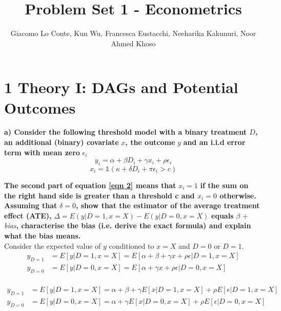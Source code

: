 \documentclass[a4paper,12pt,oneside,English]{article}
\title{Problem Set 1 - Econometrics}
\author{ Giacomo Lo Conte, Kun Wu, Francesca Eustacchi, Neeharika Kakunuri, Noor Ahmed Khoso }
\begin{document}
\maketitle
\section{ 1 Theory I: DAGs and Potential Outcomes}
\textbf{a) Consider the following threshold model with a binary treatment $D$, an additional (binary) covariate} $x$\textbf{, the outcome} $y$ \textbf{and an i.i.d error term with mean zero} $\epsilon_i$
\begin{equation}
    y_i = \alpha + \beta D_i + \gamma x_i + \rho \epsilon_i
\end{equation}
\begin{equation}
\label{eqn 2}
 x_i = \mathds{1}(\kappa + \delta D_i + \pi \epsilon_i > c) 
\end{equation}

\textbf{The second part of equation \ref{eqn 2} means that} $x_i = 1$ \textbf{if the sum on the right hand side is greater than a threshold c and $x_i = 0$ otherwise. Assuming that} $\delta = 0$\textbf{, show that the estimator of the average treatment effect (ATE), }$\Delta=E(y|D = 1 ,x = X) - E(y|D = 0 ,x = X)$ \textbf{equals}  $\beta$ + \textit{bias}\textbf{, characterise the bias (i.e. derive the exact formula)  and explain what the bias means.}\\

Consider the expected value of $y$ conditioned to $x=X$ and $D=0$ or $D=1$. 
\begin{equation}
\begin{split}
        y_{D=1}&=E[y|D=1, x=X]=E[\alpha+\beta+\gamma x + \rho \epsilon|D=1, x=X]\\
        y_{D=0}&=E[y|D=0, x=X]=E[\alpha+\gamma x + \rho \epsilon | D=0, x=X]\\
\end{split}
\end{equation}

\begin{equation}
\begin{split}
        y_{D=1}&=E[y|D=1, x=X]=\alpha+\beta+\gamma E[x|D=1, x=X] + \rho E[\epsilon|D=1, x=X]\\
        y_{D=0}&=E[y|D=0, x=X]=\alpha+\gamma E[x|D=0, x=X] + \rho E[\epsilon | D=0, x=X]\\
\end{split}
\end{equation}
\end{document}
